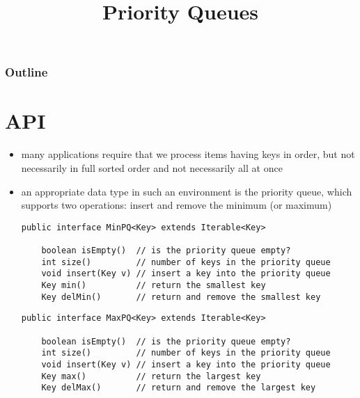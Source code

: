 \documentclass[8pt,a4paper,compress]{beamer}
\title{Priority Queues}
\date{}
\begin{document}
\begin{frame}
\vfill
\titlepage
\end{frame}

\begin{frame}
\frametitle{Outline}
\tableofcontents
\end{frame}

\section{API}
\begin{frame}[fragile]
\begin{itemize}
\item many applications require that we process items having keys in order, but not necessarily in full sorted order and not necessarily all at once

\item an appropriate data type in such an environment is the priority queue, which supports two operations: insert and remove the minimum (or maximum)

\begin{lstlisting}[language={}]
public interface MinPQ<Key> extends Iterable<Key>

    boolean isEmpty()  // is the priority queue empty?
    int size()         // number of keys in the priority queue
    void insert(Key v) // insert a key into the priority queue
    Key min()          // return the smallest key
    Key delMin()       // return and remove the smallest key
\end{lstlisting} 

\begin{lstlisting}[language={}]
public interface MaxPQ<Key> extends Iterable<Key>

    boolean isEmpty()  // is the priority queue empty?
    int size()         // number of keys in the priority queue
    void insert(Key v) // insert a key into the priority queue
    Key max()          // return the largest key
    Key delMax()       // return and remove the largest key
\end{lstlisting} 
\end{itemize}
\end{frame}
\end{document}
